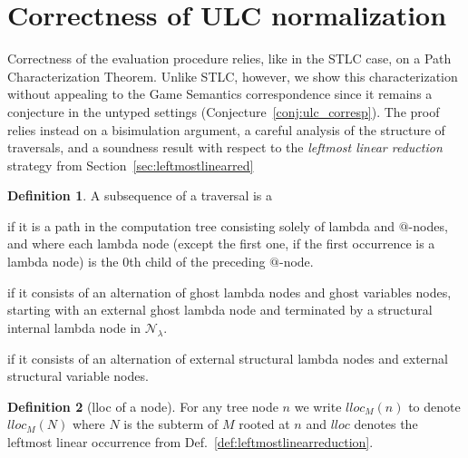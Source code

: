 \documentclass{elsarticle}
\makeatletter
\theoremstyle{plain}
\theoremstyle{definition}
\newtheorem{definition}{Definition}[section]
\theoremstyle{remark}
\newcommand\Nodes{\mathcal{N}}%
\newcommand\NodesLmd{\Nodes_\lambda}%
\renewcommand\ie{{\it i.e.\@\xspace}}
\makeatother
\begin{document}
\section{Correctness of ULC normalization}
\label{sec:correctness_ulc_normalization}
Correctness of the evaluation procedure relies, like in the STLC case, on a Path Characterization Theorem.
Unlike STLC, however, we show this characterization without appealing to the Game Semantics correspondence since it remains a conjecture in the untyped settings (Conjecture~\ref{conj:ulc_corresp}). The proof relies instead on a bisimulation argument, a careful analysis of the structure of traversals, and a soundness result with respect to the \emph{leftmost linear reduction} strategy from Section~\ref{sec:leftmostlinearred}


\begin{definition}
    \label{def:spinaldescent_pendingarglookup}
A subsequence of a traversal is a
\begin{enumerate*}[nosep,label=(\roman*)]
\item {} if it is a path in the computation tree consisting solely of lambda and $@$-nodes, and where each lambda node (except the first one, if the first occurrence is a lambda node) is the $0$th child of the preceding $@$-node.
\item {} if it consists of an alternation of ghost lambda nodes and ghost variables nodes, starting with an external ghost lambda node and terminated by a structural internal lambda node in $\NodesLmd$.
\item {} if it consists of an alternation of external structural lambda nodes and external structural variable nodes.
\end{enumerate*}
\end{definition}

\begin{definition}[lloc of a node]
For any tree node $n$ we write $lloc_M(n)$ to denote $lloc_M(N)$ where $N$ is the subterm of $M$ rooted at $n$ and $lloc$ denotes the leftmost linear occurrence from Def.~\ref{def:leftmostlinearreduction}.
\end{definition}
\end{document}
